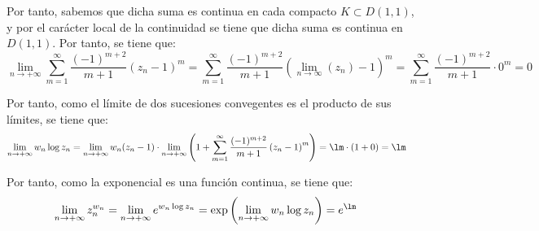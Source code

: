 \begin{ejercicio}
    Por tanto, sabemos que dicha suma es continua en cada compacto $K\subset D(1,1)$, y por el carácter local de la continuidad se tiene que dicha suma es continua en $D(1,1)$. Por tanto, se tiene que:
    \begin{equation*}
        \lim_{n\to +\infty} \sum_{m=1}^\infty \frac{(-1)^{m+2}}{m+1}\left(z_n - 1\right)^{m} = \sum_{m=1}^\infty \frac{(-1)^{m+2}}{m+1}\left(\lim_{n\to \infty}(z_n) - 1\right)^{m}
        = \sum_{m=1}^\infty \frac{(-1)^{m+2}}{m+1}\cdot 0^{m} = 0
    \end{equation*}

    Por tanto, como el límite de dos sucesiones convegentes es el producto de sus límites, se tiene que:
    \begin{align*}
        \lim_{n\to +\infty} w_n\log z_n &= \lim_{n\to +\infty} w_n(z_n - 1)\cdot \lim_{n\to +\infty} \left(1+\sum_{m=1}^\infty \frac{(-1)^{m+2}}{m+1}\left(z_n - 1\right)^{m}\right) = \lm \cdot (1+0) = \lm
    \end{align*}

    Por tanto, como la exponencial es una función continua, se tiene que:
    \begin{align*}
        \lim_{n\to +\infty} z_n^{w_n} &= \lim_{n\to +\infty} e^{w_n\log z_n} = \exp\left(\lim_{n\to +\infty} w_n\log z_n\right) = e^\lm
    \end{align*}
\end{ejercicio}

